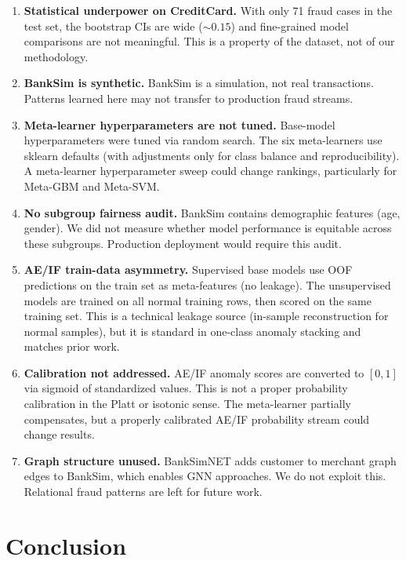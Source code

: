 \documentclass[11pt]{article}
\begin{document}
\begin{enumerate}
    \item \textbf{Statistical underpower on CreditCard.} With only 71 fraud cases in the test set, the bootstrap CIs are wide ($\sim 0.15$) and fine-grained model comparisons are not meaningful. This is a property of the dataset, not of our methodology.
    \item \textbf{BankSim is synthetic.} BankSim is a simulation, not real transactions. Patterns learned here may not transfer to production fraud streams.
    \item \textbf{Meta-learner hyperparameters are not tuned.} Base-model hyperparameters were tuned via random search. The six meta-learners use sklearn defaults (with adjustments only for class balance and reproducibility). A meta-learner hyperparameter sweep could change rankings, particularly for Meta-GBM and Meta-SVM.
    \item \textbf{No subgroup fairness audit.} BankSim contains demographic features (age, gender). We did not measure whether model performance is equitable across these subgroups. Production deployment would require this audit.
    \item \textbf{AE/IF train-data asymmetry.} Supervised base models use OOF predictions on the train set as meta-features (no leakage). The unsupervised models are trained on all normal training rows, then scored on the same training set. This is a technical leakage source (in-sample reconstruction for normal samples), but it is standard in one-class anomaly stacking and matches prior work.
    \item \textbf{Calibration not addressed.} AE/IF anomaly scores are converted to $[0,1]$ via sigmoid of standardized values. This is not a proper probability calibration in the Platt or isotonic sense. The meta-learner partially compensates, but a properly calibrated AE/IF probability stream could change results.
    \item \textbf{Graph structure unused.} BankSimNET adds customer to merchant graph edges to BankSim, which enables GNN approaches. We do not exploit this. Relational fraud patterns are left for future work.
\end{enumerate}

\section{Conclusion}
\end{document}
